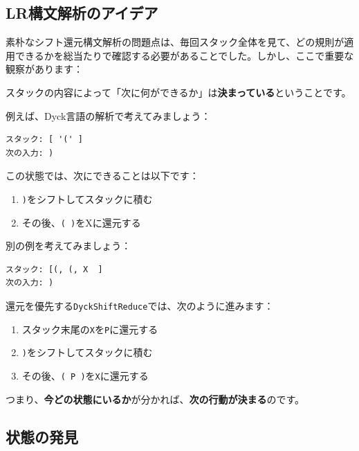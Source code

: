 \hypertarget{chapter5-lrux69cbux6587ux89e3ux6790ux306eux30a2ux30a4ux30c7ux30a2}{%
\subsection{LR構文解析のアイデア}\label{chapter5-lrux69cbux6587ux89e3ux6790ux306eux30a2ux30a4ux30c7ux30a2}}

素朴なシフト還元構文解析の問題点は、毎回スタック全体を見て、どの規則が適用できるかを総当たりで確認する必要があることでした。しかし、ここで重要な観察があります：

スタックの内容によって「次に何ができるか」は\textbf{決まっている}ということです。

例えば、Dyck言語の解析で考えてみましょう：

\begin{verbatim}
スタック: [ '(' ]
次の入力: )
\end{verbatim}

この状態では、次にできることは以下です：

\begin{enumerate}
\def\labelenumi{\arabic{enumi}.}
\tightlist
\item
  \texttt{)}をシフトしてスタックに積む
\item
  その後、\texttt{(\ )}をXに還元する
\end{enumerate}

別の例を考えてみましょう：

\begin{verbatim}
スタック: [(, (, X  ]
次の入力: )
\end{verbatim}

還元を優先する\texttt{DyckShiftReduce}では、次のように進みます：

\begin{enumerate}
\def\labelenumi{\arabic{enumi}.}
\tightlist
\item
  スタック末尾の\texttt{X}を\texttt{P}に還元する
\item
  \texttt{)}をシフトしてスタックに積む
\item
  その後、\texttt{(\ P\ )}を\texttt{X}に還元する
\end{enumerate}

つまり、\textbf{今どの状態にいるか}が分かれば、\textbf{次の行動が決まる}のです。

\hypertarget{chapter5-ux72b6ux614bux306eux767aux898b}{%
\subsection{状態の発見}\label{chapter5-ux72b6ux614bux306eux767aux898b}}

